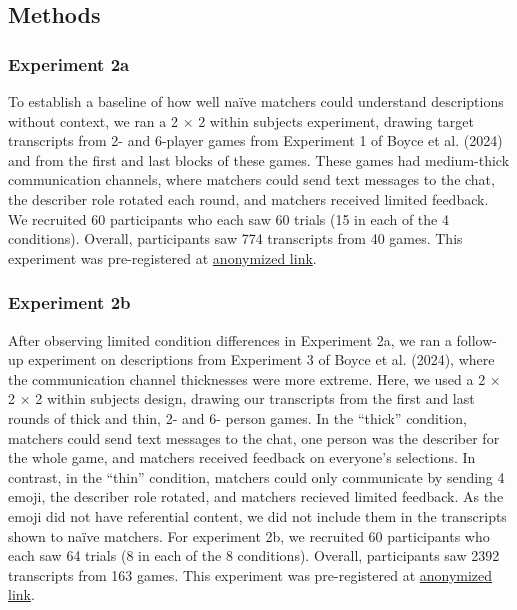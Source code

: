 \documentclass[10pt, letterpaper]{article}
\begin{document}
\subsection{Methods}\label{methods-1}

\subsubsection{Experiment 2a}\label{experiment-2a}

To establish a baseline of how well naïve matchers could understand
descriptions without context, we ran a 2 \(\times\) 2 within subjects
experiment, drawing target transcripts from 2- and 6-player games from
Experiment 1 of Boyce et al. (2024) and from the first and last blocks
of these games. These games had medium-thick communication channels,
where matchers could send text messages to the chat, the describer role
rotated each round, and matchers received limited feedback. We recruited
60 participants who each saw 60 trials (15 in each of the 4 conditions).
Overall, participants saw 774 transcripts from 40 games. This experiment
was pre-registered at
\href{https://osf.io/k45dr/?view_only=1f4bbadb8e6b4b5f8d04cf04392967dd}{anonymized
link}.

\subsubsection{Experiment 2b}\label{experiment-2b}

After observing limited condition differences in Experiment 2a, we ran a
follow-up experiment on descriptions from Experiment 3 of Boyce et al.
(2024), where the communication channel thicknesses were more extreme.
Here, we used a 2 \(\times\) 2 \(\times\) 2 within subjects design,
drawing our transcripts from the first and last rounds of thick and
thin, 2- and 6- person games. In the ``thick'' condition, matchers could
send text messages to the chat, one person was the describer for the
whole game, and matchers received feedback on everyone's selections. In
contrast, in the ``thin'' condition, matchers could only communicate by
sending 4 emoji, the describer role rotated, and matchers recieved
limited feedback. As the emoji did not have referential content, we did
not include them in the transcripts shown to naïve matchers. For
experiment 2b, we recruited 60 participants who each saw 64 trials (8 in
each of the 8 conditions). Overall, participants saw 2392 transcripts
from 163 games. This experiment was pre-registered at
\href{https://osf.io/rdp5k/?view_only=87452ac1a7894f98b51b5642346e9e3d}{anonymized
link}.
\end{document}
